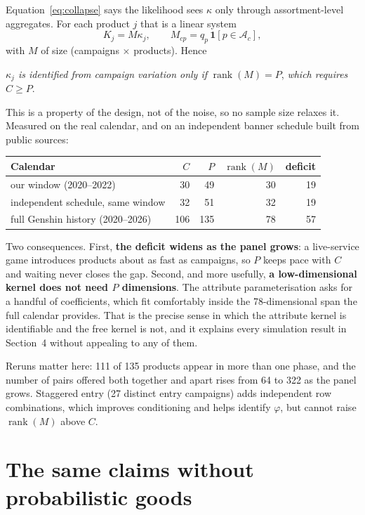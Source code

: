 \documentclass[11pt]{article}
\begin{document}
Equation~\eqref{eq:collapse} says the likelihood sees $\kappa$ only through
assortment-level aggregates. For each product $j$ that is a linear system
\[
K_j = M \kappa_j, \qquad M_{c p} = q_p\, \mathbf{1}[p \in \mathcal{A}_c],
\]
with $M$ of size (campaigns $\times$ products). Hence

\begin{center}
\emph{$\kappa_j$ is identified from campaign variation only if}
$\operatorname{rank}(M) = P$, \emph{which requires} $C \ge P$.
\end{center}

\noindent This is a property of the design, not of the noise, so no sample size
relaxes it. Measured on the real calendar, and on an independent banner schedule
built from public sources:

\begin{center}\small
\begin{tabular}{lrrrr}
\toprule
Calendar & $C$ & $P$ & $\operatorname{rank}(M)$ & deficit \\
\midrule
our window (2020--2022) & 30 & 49 & 30 & 19 \\
independent schedule, same window & 32 & 51 & 32 & 19 \\
full Genshin history (2020--2026) & 106 & 135 & 78 & 57 \\
\bottomrule
\end{tabular}
\end{center}

\noindent Two consequences. First, \textbf{the deficit widens as the panel
grows}: a live-service game introduces products about as fast as campaigns, so
$P$ keeps pace with $C$ and waiting never closes the gap. Second, and more
usefully, \textbf{a low-dimensional kernel does not need $P$ dimensions}. The
attribute parameterisation asks for a handful of coefficients, which fit
comfortably inside the 78-dimensional span the full calendar provides. That is
the precise sense in which the attribute kernel is identifiable and the free
kernel is not, and it explains every simulation result in Section~4 without
appealing to any of them.

Reruns matter here: 111 of 135 products appear in more than one phase, and the
number of pairs offered both together and apart rises from 64 to 322 as the
panel grows. Staggered entry (27 distinct entry campaigns) adds independent row
combinations, which improves conditioning and helps identify $\varphi$, but
cannot raise $\operatorname{rank}(M)$ above $C$.

\section{The same claims without probabilistic goods}\label{sec:nesting}
\end{document}
